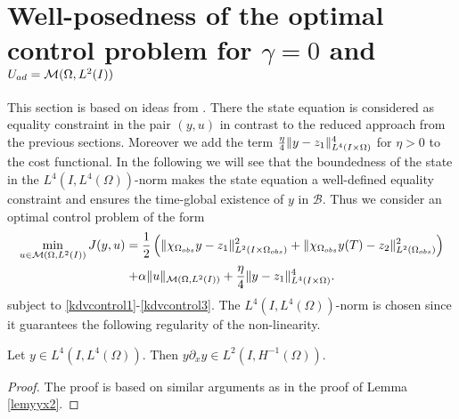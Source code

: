 \section{Well-posedness of the optimal control problem for $\gamma=0$ and $U_{ad}=\mathcal{M}(\Omega, L^{2}(I))$}
This section is based on ideas from \cite{lions1985control}. There the state equation is considered as equality constraint in the pair $(y,u)$ in contrast to the reduced approach from the previous sections. Moreover we add the term $\frac{\eta}{4} \lVert y - z_1\rVert_{L^4(I\times \Omega)}^4$ for $\eta >0$ to the cost functional. In the following we will see that the boundedness of the state in the $L^4(I,L^4(\Omega))$-norm makes the state equation a well-defined equality constraint and ensures the time-global existence of $y$ in $\mathcal B$. Thus we consider an optimal control problem of the form
\begin{multline}
\min_{u \in \mathcal{M}(\Omega, L^{2}(I))}J(y,u)=\frac{1}{2}\left(\lVert\chi_{\Omega_{obs}}y - z_1\rVert_{L^2(I\times \Omega_{obs})}^2+\|\chi_{\Omega_{obs}}y(T)-z_2\|_{L^2(\Omega_{obs})}^2\right) \\+ \alpha \lVert u\rVert_{\mathcal{M}(\Omega, L^{2}(I))} + \frac{\eta}{4} \lVert y - z_1\rVert_{L^4(I\times \Omega)}^4.
\label{cost2}
\end{multline}
subject to \eqref{kdvcontrol1}-\eqref{kdvcontrol3}. The $L^4(I,L^4(\Omega))$-norm is chosen since it guarantees the following regularity of the non-linearity.  
\begin{lem}
\label{lemyyxL4}
 Let $y \in L^4(I,L^4(\Omega))$. Then $y \partial_x y \in L^2(I,H^{-1}(\Omega))$.
\end{lem}
\begin{proof}
The proof is based on similar arguments as in the proof of Lemma \ref{lemyyx2}.
\end{proof}
